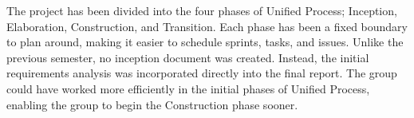 The project has been divided into the four phases of Unified Process; Inception,
Elaboration, Construction, and Transition. Each phase has been a fixed boundary
to plan around, making it easier to schedule sprints, tasks, and issues. Unlike
the previous semester, no inception document was created. Instead, the initial
requirements analysis was incorporated directly into the final report. The group
could have worked more efficiently in the initial phases of Unified Process,
enabling the group to begin the Construction phase sooner.
